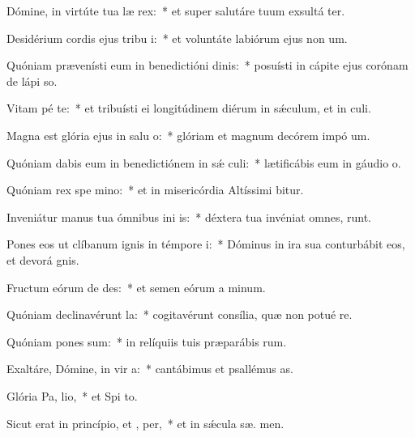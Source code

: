 \item Dómine, in virtúte tua læ rex:~* et super salutáre tuum exsultá ter.
\item Desidérium cordis ejus tribu i:~* et voluntáte labiórum ejus non  um.
\item Quóniam prævenísti eum in benedictióni dinis:~* posuísti in cápite ejus corónam de lápi so.
\item Vitam pé  te:~* et tribuísti ei longitúdinem diérum in sǽculum, et in  culi.
\item Magna est glória ejus in salu o:~* glóriam et magnum decórem impó  um.
\item Quóniam dabis eum in benedictiónem in sǽ culi:~* lætificábis eum in gáudio   o.
\item Quóniam rex spe  mino:~* et in misericórdia Altíssimi  bitur.
\item Inveniátur manus tua ómnibus ini is:~* déxtera tua invéniat omnes,   runt.
\item Pones eos ut clíbanum ignis in témpore  i:~* Dóminus in ira sua conturbábit eos, et devorá  gnis.
\item Fructum eórum de  des:~* et semen eórum a  minum.
\item Quóniam declinavérunt   la:~* cogitavérunt consília, quæ non potué re.
\item Quóniam pones  sum:~* in relíquiis tuis præparábis  rum.
\item Exaltáre, Dómine, in vir a:~* cantábimus et psallémus  as.
\item Glória Pa,  lio,~* et Spi to.
\item Sicut erat in princípio, et ,  per,~* et in sǽcula sæ. men.

